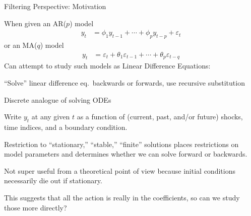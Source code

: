 \documentclass[aspectratio=169, handout]{beamer}
\begin{document}
{\scriptsize
\begin{frame}{Filtering Perspective: Motivation}

When given an AR($p$) model
\begin{align*}
  y_t &= \phi_1 y_{t-1} + \cdots + \phi_p y_{t-p} + \varepsilon_t
\end{align*}
or an MA($q$) model
\begin{align*}
  y_t
  &=
  \varepsilon_t
  +
  \theta_1 \varepsilon_{t-1}
  + \cdots + \theta_p \varepsilon_{t-q}
\end{align*}
Can attempt to study such models as \alert{Linear Difference Equations}:
\begin{itemize}
  {\scriptsize
  \item ``Solve'' linear difference eq.\ backwards or forwards,
    use recursive substitution
  \item Discrete analogue of solving ODEs
  \item Write $y_t$ at any given $t$ as a function of (current,
    past, and/or future) shocks, time indices, and a boundary
    condition.
  \pause
  \item Restriction to ``stationary,'' ``stable,'' ``finite'' solutions
    places restrictions on model \alert{parameters} and determines
    whether we can solve forward or backwards.
  \pause
  \item Not super useful from a theoretical point of view because
    initial conditions necessarily \alert{die out} if stationary.
  \item This suggests that all the action is really in the
    coefficients, so can we study those more directly?
  }
\end{itemize}
\end{frame}
}
\end{document}
